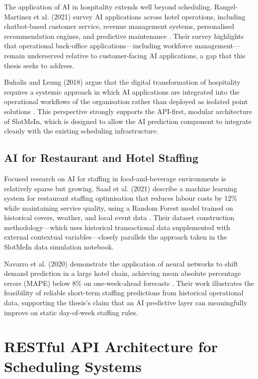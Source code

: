 \documentclass[12pt,a4paper]{report}
\begin{document}
The application of AI in hospitality extends well beyond scheduling. Rangel-Martinez et al. (2021) survey AI applications across hotel operations, including chatbot-based customer service, revenue management systems, personalised recommendation engines, and predictive maintenance \cite{rangel_et_al_2021}. Their survey highlights that operational back-office applications—including workforce management—remain underserved relative to customer-facing AI applications, a gap that this thesis seeks to address.

Buhalis and Leung (2018) argue that the digital transformation of hospitality requires a systemic approach in which AI applications are integrated into the operational workflows of the organisation rather than deployed as isolated point solutions \cite{buhalis_leung_2018}. This perspective strongly supports the API-first, modular architecture of SlotMeIn, which is designed to allow the AI prediction component to integrate cleanly with the existing scheduling infrastructure.

\subsection{AI for Restaurant and Hotel Staffing}

Focused research on AI for staffing in food-and-beverage environments is relatively sparse but growing. Saad et al. (2021) describe a machine learning system for restaurant staffing optimisation that reduces labour costs by 12\% while maintaining service quality, using a Random Forest model trained on historical covers, weather, and local event data \cite{saad_et_al_2021}. Their dataset construction methodology—which uses historical transactional data supplemented with external contextual variables—closely parallels the approach taken in the SlotMeIn data simulation notebook.

Navarro et al. (2020) demonstrate the application of neural networks to shift demand prediction in a large hotel chain, achieving mean absolute percentage errors (MAPE) below 8\% on one-week-ahead forecasts \cite{navarro_et_al_2020}. Their work illustrates the feasibility of reliable short-term staffing predictions from historical operational data, supporting the thesis's claim that an AI predictive layer can meaningfully improve on static day-of-week staffing rules.

\section{RESTful API Architecture for Scheduling Systems}
\end{document}
